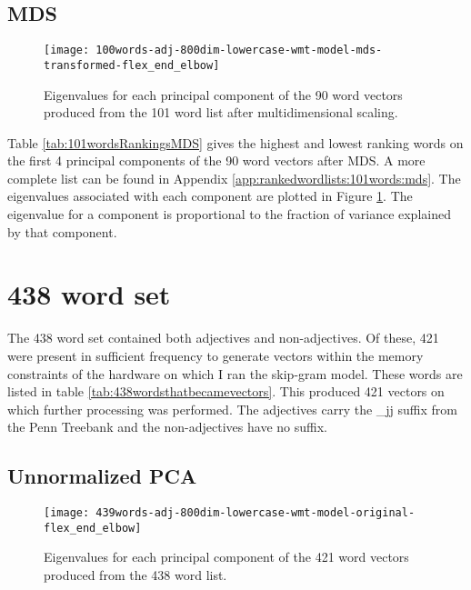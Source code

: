 \subsection{MDS}



\begin{figure}[!tbp]
    \texttt{[image: 100words-adj-800dim-lowercase-wmt-model-mds-transformed-flex\_end\_elbow]}
    \caption{Eigenvalues for each principal component of the 90 word vectors
    produced from the 101 word list after multidimensional scaling.}
    \label{fig:101wordsmdseigenvalues}
\end{figure}

Table \ref{tab:101wordsRankingsMDS} gives the highest and lowest
ranking words on the first 4 principal components of the 90 word 
vectors after MDS. A more complete list can be found in Appendix 
\ref{app:rankedwordlists:101words:mds}. The eigenvalues associated 
with each component are plotted in Figure 
\ref{fig:101wordsmdseigenvalues}. The eigenvalue for a component is
proportional to the fraction of variance explained by that component.


\section{438 word set}

The 438 word set contained both adjectives and non-adjectives. Of these, 421 
were present in sufficient frequency to generate vectors within the memory 
constraints of the hardware on which I ran the skip-gram model. These words are 
listed in table \ref{tab:438wordsthatbecamevectors}. This produced 421 vectors 
on which further processing was performed. The adjectives carry the \_jj suffix 
from the Penn Treebank \citep{Marcus1993} and the non-adjectives have 
no suffix.




\subsection{Unnormalized PCA}



\begin{figure}[!tbp]
    \texttt{[image: 439words-adj-800dim-lowercase-wmt-model-original-flex\_end\_elbow]}
    \caption{Eigenvalues for each principal component of the 421 word vectors
    produced from the 438 word list.}
    \label{fig:438wordsunnormalizedpcaeigenvalues}
\end{figure}

